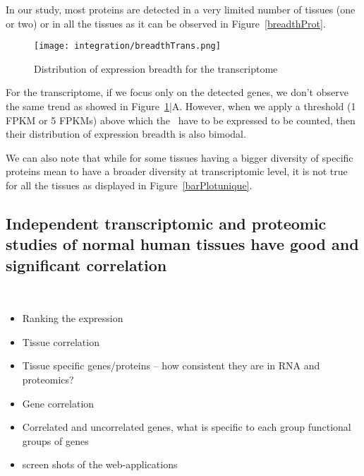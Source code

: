 In our study, most proteins are detected in a very limited number of tissues (one
or two) or in all the tissues as it can be observed in Figure~\ref{breadthProt}.


\begin{figure}
    \texttt{[image: integration/breadthTrans.png]}\centering
    \caption{Distribution of expression breadth for the
    transcriptome\label{breadthTrans}}
\end{figure}

For the transcriptome, if we focus only on the detected genes, we don’t observe
the same trend as showed in Figure~\ref{breadthTrans}|A.
However, when we apply a threshold (1 \gls{FPKM} or 5 \glspl{FPKM})
above which the \mRNAs\ have to be expressed to be counted, then their distribution
of expression breadth is also bimodal.

We can also note that while for some tissues having a bigger diversity of
specific proteins mean to have a broader diversity at transcriptomic level,
it is not true for all the tissues as displayed in
Figure~\ref{barPlotunique}.






\subsection{Independent transcriptomic and proteomic studies of normal
human tissues have good and significant correlation}
\label{sec:IntegrationGoodCorrProtTrans}



\clearpage\

\begin{itemize}
\item Ranking the expression
\item Tissue correlation
\item Tissue specific genes/proteins – how consistent they are in RNA and proteomics?
\item Gene correlation
\item Correlated and uncorrelated genes, what is specific to each group
    functional groups of genes
\item screen shots of the web-applications
\end{itemize}


